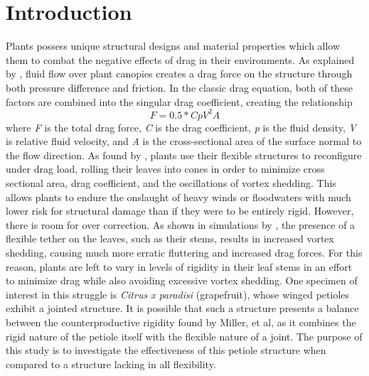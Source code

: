 \documentclass[]{article}
\begin{document}
\section{Introduction}
	Plants possess unique structural designs and material properties which allow them to combat the negative effects of drag in their environments. As explained by \citep{delangre,2008}, fluid flow over plant canopies creates a drag force on the structure through both pressure difference and friction. In the classic drag equation, both of these factors are combined into the singular drag coefficient, creating the relationship
\[F=0.5*CpV^2A\]where \textit{F} is the total drag force, \textit{C} is the drag coefficient, \textit{p} is the fluid density, \textit{V} is relative fluid velocity, and \textit{A} is the cross-sectional area of the surface normal to the flow direction. As found by \citep{vogel,1989}, plants use their flexible structures to reconfigure under drag load, rolling their leaves into cones in order to minimize cross sectional area, drag coefficient, and the oscillations of vortex shedding. This allows plants to endure the onslaught of heavy winds or floodwaters with much lower risk for structural damage than if they were to be entirely rigid. 
	However, there is room for over correction. As shown in simulations by \citep{miller, et al,2012}, the presence of a flexible tether on the leaves, such as their stems, results in increased vortex shedding, causing much more erratic fluttering and increased drag forces. For this reason, plants are left to vary in levels of rigidity in their leaf stems in an effort to minimize drag while also avoiding excessive vortex shedding. 
    One specimen of interest in this struggle is \emph{Citrus x paradisi} (grapefruit), whose winged petioles exhibit a jointed structure. It is possible that such a structure presents a balance between the counterproductive rigidity found by Miller, et al, as it combines the rigid nature of the petiole itself with the flexible nature of a joint. The purpose of this study is to investigate the effectiveness of this petiole structure when compared to a structure lacking in all flexibility.
\end{document}
